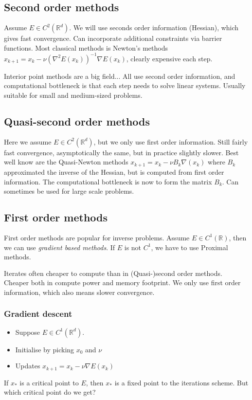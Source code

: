 \documentclass[12pt]{article}
\theoremstyle{definition}
\newcommand{\real}{\mathbb{R}}   %
\begin{document}
\subsection{Second order methods}
Assume $E\in C^2(\real^d)$. We will use seconds order information (Hessian), which gives fast convergence. Can incorporate additional constraints via barrier functions. Most classical methods is Newton's methods $x_{k+1} = x_k - \nu (\nabla^2E(x_k))^{-1}\nabla E(x_k)$, clearly expensive each step.

Interior point methods are a big field... All use second order information, and computational bottleneck is that each step needs to solve linear systems. Usually suitable for small and medium-sized problems.


\subsection{Quasi-second order methods}
Here we assume $E\in C^2(\real^d)$, but we only use first order information. Still fairly fast convergence, asymptotically the same, but in practice slightly slower. Best well know are the Quasi-Newton methods $x_{k+1} = x_k - \nu B_k \nabla(x_k)$ where $B_k$ approximated the inverse of the Hessian, but is computed from first order information. The computational bottleneck is now to form the matrix $B_k$. Can sometimes be used for large scale problems. 

\subsection{First order methods}
First order methods are popular for inverse problems. Assume $E\in C^1(\real)$, then we can use \textit{gradient based methods}. If $E$ is not $C^1$, we have to use Proximal methods.

Iterates often cheaper to compute than in (Quasi-)second order methods. Cheaper both in compute power and memory footprint. We only use first order information, which also means slower convergence. 

\subsubsection{Gradient descent}
\begin{itemize}
    \item Suppose $E\in C^1(\real^d)$.
    \item Initialise by picking $x_0$ and $\nu$
    \item Updates $x_{k+1} = x_k - \nu\nabla E(x_k)$
\end{itemize}
If $x_*$ is a critical point to $E$, then $x_*$ is a fixed point to the iterations scheme. But which critical point do we get? 
\end{document}
